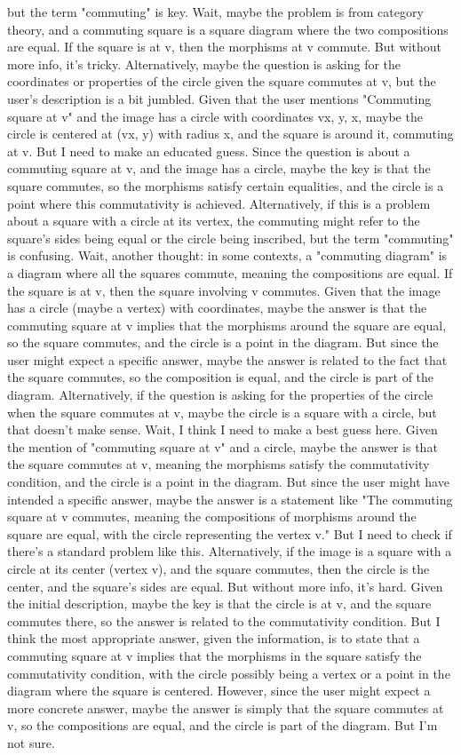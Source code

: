but the term "commuting" is key. Wait, maybe the problem is from category theory, and a commuting square is a square diagram where the two compositions are equal. If the square is at v, then the morphisms at v commute. But without more info, it's tricky. Alternatively, maybe the question is asking for the coordinates or properties of the circle given the square commutes at v, but the user's description is a bit jumbled. Given that the user mentions "Commuting square at v" and the image has a circle with coordinates vx, y, x, maybe the circle is centered at (vx, y) with radius x, and the square is around it, commuting at v. But I need to make an educated guess. Since the question is about a commuting square at v, and the image has a circle, maybe the key is that the square commutes, so the morphisms satisfy certain equalities, and the circle is a point where this commutativity is achieved. Alternatively, if this is a problem about a square with a circle at its vertex, the commuting might refer to the square's sides being equal or the circle being inscribed, but the term "commuting" is confusing. Wait, another thought: in some contexts, a "commuting diagram" is a diagram where all the squares commute, meaning the compositions are equal. If the square is at v, then the square involving v commutes. Given that the image has a circle (maybe a vertex) with coordinates, maybe the answer is that the commuting square at v implies that the morphisms around the square are equal, so the square commutes, and the circle is a point in the diagram. But since the user might expect a specific answer, maybe the answer is related to the fact that the square commutes, so the composition is equal, and the circle is part of the diagram. Alternatively, if the question is asking for the properties of the circle when the square commutes at v, maybe the circle is a square with a circle, but that doesn't make sense. Wait, I think I need to make a best guess here. Given the mention of "commuting square at v" and a circle, maybe the answer is that the square commutes at v, meaning the morphisms satisfy the commutativity condition, and the circle is a point in the diagram. But since the user might have intended a specific answer, maybe the answer is a statement like "The commuting square at v commutes, meaning the compositions of morphisms around the square are equal, with the circle representing the vertex v." But I need to check if there's a standard problem like this. Alternatively, if the image is a square with a circle at its center (vertex v), and the square commutes, then the circle is the center, and the square's sides are equal. But without more info, it's hard. Given the initial description, maybe the key is that the circle is at v, and the square commutes there, so the answer is related to the commutativity condition. But I think the most appropriate answer, given the information, is to state that a commuting square at v implies that the morphisms in the square satisfy the commutativity condition, with the circle possibly being a vertex or a point in the diagram where the square is centered. However, since the user might expect a more concrete answer, maybe the answer is simply that the square commutes at v, so the compositions are equal, and the circle is part of the diagram. But I'm not sure. 